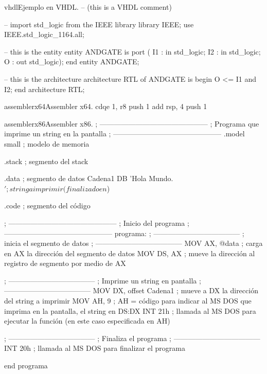 \begin{sourcecode}{vhdl}{Ejemplo en VHDL.}
-- (this is a VHDL comment)

-- import std_logic from the IEEE library
library IEEE;
use IEEE.std_logic_1164.all;

-- this is the entity
entity ANDGATE is
	port (
		I1 : in std_logic;
		I2 : in std_logic;
		O  : out std_logic);
end entity ANDGATE;

-- this is the architecture
architecture RTL of ANDGATE is
begin
	O <= I1 and I2;
end architecture RTL;
\end{sourcecode}

\begin{sourcecode}{assemblerx64}{Assembler x64.}
cdqe 1, r8
push 1
add rsp, 4
push 1
\end{sourcecode}

\begin{sourcecode}{assemblerx86}{Assembler x86.}
; ---------------------------------------------
; Programa que imprime un string en la pantalla
; ---------------------------------------------
	.model small              ; modelo de memoria

	.stack                    ; segmento del stack

	.data                     ; segmento de datos
	Cadena1 DB 'Hola Mundo.$' ; string a imprimir (finalizado en $)

	.code                     ; segmento del código

; ---------------------------------------------
; Inicio del programa
; ---------------------------------------------
	programa:
		; ------------------------------------
		; inicia el segmento de datos
		; ------------------------------------
		MOV AX, @data          ; carga en AX la dirección del segmento de datos
		MOV DS, AX             ; mueve la dirección al registro de segmento por medio de AX
		
		; ------------------------------------
		; Imprime un string en pantalla
		; ------------------------------------
		MOV DX, offset Cadena1 ; mueve a DX la dirección del string a imprimir
		MOV AH, 9              ; AH = código para indicar al MS DOS que imprima en la pantalla, el string en DS:DX
		INT 21h                ; llamada al MS DOS para ejecutar la función (en este caso especificada en AH)
		
		; ------------------------------------
		; Finaliza el programa
		; ------------------------------------
		INT 20h                ; llamada al MS DOS para finalizar el programa

	end programa
\end{sourcecode}

